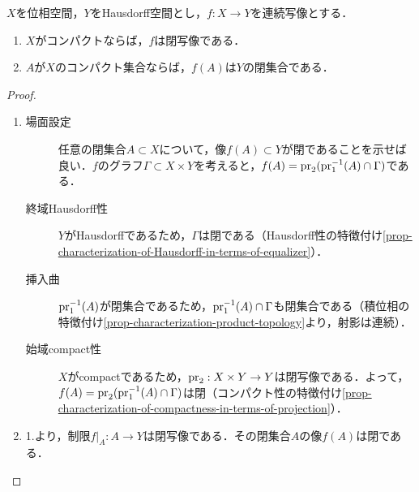 \documentclass[uplatex,dvipdfmx]{jsreport}
\begin{document}
\begin{proposition}\label{prop-continuous-map-from-compact-to-Hausdorff}
    $X$を位相空間，$Y$をHausdorff空間とし，$f:X\to Y$を連続写像とする．
    \begin{enumerate}
        \item $X$がコンパクトならば，$f$は閉写像である．
        \item $A$が$X$のコンパクト集合ならば，$f(A)$は$Y$の閉集合である．
    \end{enumerate}
\end{proposition}
\begin{proof}\mbox{}
    \begin{enumerate}
        \item \begin{description}
            \item[場面設定] 任意の閉集合$A\subset X$について，像$f(A)\subset Y$が閉であることを示せば良い．$f$のグラフ$\Gamma\subset X\times Y$を考えると，$f(A)=\mathrm{pr}_2(\mathrm{pr}_1^{-1}(A)\cap\Gamma)$である．
            \item[終域Hausdorff性] $Y$がHausdorffであるため，$\Gamma$は閉である（Hausdorff性の特徴付け\ref{prop-characterization-of-Hausdorff-in-terms-of-equalizer}）．
            \item[挿入曲] $\mathrm{pr}_1^{-1}(A)$が閉集合であるため，$\mathrm{pr}_1^{-1}(A)\cap\Gamma$も閉集合である（積位相の特徴付け\ref{prop-characterization-product-topology}より，射影は連続）．
            \item[始域compact性] $X$がcompactであるため，$\mathrm{pr}_2:X\times Y\to Y$は閉写像である．よって，$f(A)=\mathrm{pr}_2(\mathrm{pr}_1^{-1}(A)\cap\Gamma)$は閉（コンパクト性の特徴付け\ref{prop-characterization-of-compactness-in-terms-of-projection}）．
        \end{description}
        \item 
        1.より，制限$f|_A:A\to Y$は閉写像である．その閉集合$A$の像$f(A)$は閉である．
    \end{enumerate}
\end{proof}
\end{document}
